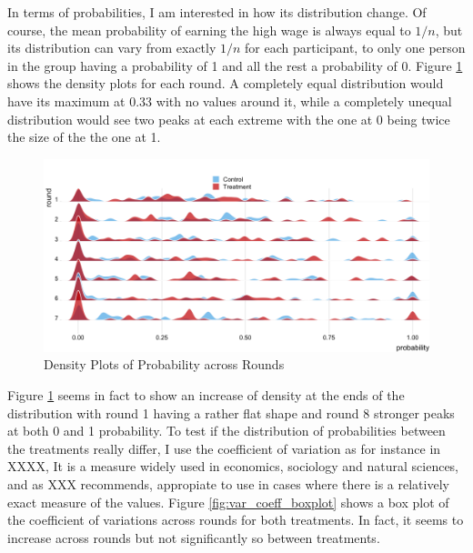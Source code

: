 In terms of probabilities, I am interested in how its distribution change. Of course, the mean probability of earning the high wage is always equal to $1/n$, but its distribution can vary from exactly $1/n$ for each participant, to only one person in the group having a probability of 1 and all the rest a probability of 0. Figure \ref{fig:dens_prob} shows the density plots for each round. A completely equal distribution would have its maximum at 0.33 with no values around it, while a completely unequal distribution would see two peaks at each extreme with the one at 0 being twice the size of the the one at 1.\\

\begin{figure}[H]
    \centering
    \includegraphics[width = \textwidth]{graphs/density_ridge_prob.png}
    \caption{Density Plots of Probability across Rounds}
    \label{fig:dens_prob}
\end{figure}

Figure \ref{fig:dens_prob} seems in fact to show an increase of density at the ends of the distribution with round 1 having a rather flat shape and round 8 stronger peaks at both 0 and 1 probability. To test if the distribution of probabilities between the treatments really differ, I use the coefficient of variation as for instance in XXXX, It is a measure widely used in economics, sociology and natural sciences, and as XXX recommends, appropiate to use in cases where there is a relatively exact measure of the values. Figure \ref{fig:var_coeff_boxplot} shows a box plot of the coefficient of variations across rounds for both treatments. In fact, it seems to increase across rounds but not significantly so between treatments.\\

